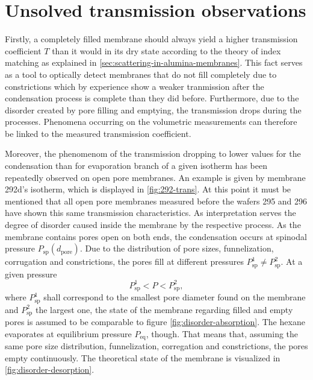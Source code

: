 \documentclass[../thesis.tex]{subfiles}
\begin{document}
    \section{Unsolved transmission observations}
    \label{sec:unsolved-transmission}

              

              Firstly, a completely filled membrane should always yield a higher transmission coefficient $T$ than it would in its dry state according to the theory of index matching as explained in \cref{sec:scattering-in-alumina-membranes}. This fact serves as a tool to optically detect membranes that do not fill completely due to constrictions which by experience show a weaker tranmission after the condensation process is complete than they did before. Furthermore, due to the disorder created by pore filling and emptying, the transmission drops during the processes. Phenomena occurring on the volumetric measurements can therefore be linked to the measured transmission coefficient.

              Moreover, the phenomenom of the transmission dropping to lower values for the condensation than for evaporation branch of a given isotherm has been repeatedly observed on open pore membranes. An example is given by membrane 292d's isotherm, which is displayed in \cref{fig:292-trans}. At this point it must be mentioned that all open pore membranes measured before the wafers 295 and 296 have shown this same transmission characteristics. As interpretation serves the degree of disorder caused inside the membrane by the respective process. As the membrane contains pores open on both ends, the condensation occurs at spinodal pressure $P_\mathrm{sp}(d_\mathrm{pore})$. Due to the distribution of pore sizes, funnelization, corrugation and constrictions, the pores fill at different pressures $P_\mathrm{sp}^1 \neq P_\mathrm{sp}^2$. At a given pressure
              \begin{equation*}
                  P_\mathrm{sp}^1 < P < P_\mathrm{sp}^2,
              \end{equation*}
              where $P_\mathrm{sp}^1$ shall correspond to the smallest pore diameter found on the membrane and $P_\mathrm{sp}^2$ the largest one, the state of the me{}mbrane regarding filled and empty pores is assumed to be comparable to figure \cref{fig:disorder-absorption}. The hexane evaporates at equilibrium pressure $P_\mathrm{eq}$, though. That means that, assuming the same pore size distribution, funnelization, corregation and constrictions, the pores empty continuously. The theoretical state of the membrane is visualized in \cref{fig:disorder-desorption}.
\end{document}
